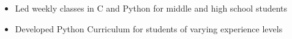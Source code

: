 \begin{itemize}
    \item Led weekly classes in C and Python for middle and high school students  
    \item Developed Python Curriculum for students of varying experience levels
\end{itemize}


